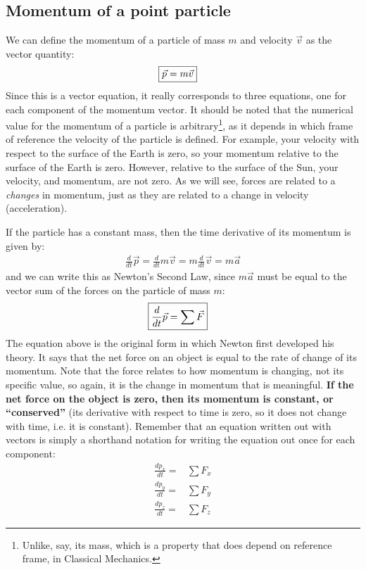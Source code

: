 \subsection{Momentum of a point particle}
We can define the momentum of a particle of mass $m$ and velocity $\vec v$ as the vector quantity:
\begin{align}
\Aboxed{\vec p = m\vec v}
\end{align}
Since this is a vector equation, it really corresponds to three equations, one for each component of the momentum vector. It should be noted that the numerical value for the momentum of a particle is arbitrary\footnote{Unlike, say, its mass, which is a property that does depend on reference frame, in Classical Mechanics.}, as it depends in which frame of reference the velocity of the particle is defined. For example, your velocity with respect to the surface of the Earth is zero, so your momentum relative to the surface of the Earth is zero. However, relative to the surface of the Sun, your velocity, and momentum, are not zero. As we will see, forces are related to a \textit{changes} in momentum, just as they are related to a change in velocity (acceleration). 

If the particle has a constant mass, then the time derivative of its momentum is given by:
\begin{align*}
\frac{d}{dt}\vec p = \frac{d}{dt}m\vec v = m\frac{d}{dt}\vec v=m\vec a
\end{align*}
and we can write this as Newton's Second Law, since $m\vec a$ must be equal to the vector sum of the forces on the particle of mass $m$:
\begin{align}
\Aboxed{\frac{d}{dt}\vec p = \sum \vec F}
\end{align}
The equation above is the original form in which Newton first developed his theory. It says that the net force on an object is equal to the rate of change of its momentum. Note that the force relates to how momentum is changing, not its specific value, so again, it is the change in momentum that is meaningful. \textbf{If the net force on the object is zero, then its momentum is constant, or ``conserved''} (its derivative with respect to time is zero, so it does not change with time, i.e. it is constant). Remember that an equation written out with vectors is simply a shorthand notation for writing the equation out once for each component:
\begin{align*}
\frac{dp_x}{dt} =& \sum F_x\\
\frac{dp_y}{dt} =& \sum F_y\\
\frac{dp_z}{dt} =& \sum F_z
\end{align*}

